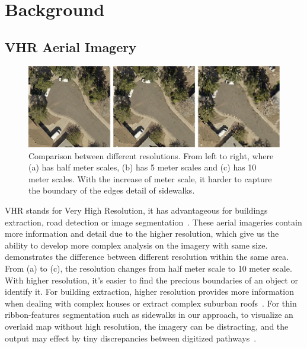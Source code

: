 \chapter{Background}


\section{\ac{VHR} Aerial Imagery}

\begin{figure}[H]
    \centering
    \includegraphics[width=\textwidth]{Figures/arz_7_res_compare.png}
    \caption[Resolution Comparison]{Comparison between different resolutions. From left to right, where (a) has half meter scales, (b) has 5 meter scales and (c) has 10 meter scales. With the increase of meter scale, it harder to capture the boundary of the edges detail of sidewalks.}
    \label{fig:vhr_compare}
\end{figure}

\ac{VHR} stands for Very High Resolution, it has advantageous for buildings extraction, road detection or image segmentation~\cite{FREIRE20141, 10.1007/BFb0015525, 10.1007/978-3-642-15567-3_16}. 
These aerial imageries contain more information and detail due to the higher resolution, which give us the ability to develop more complex analysis on the imagery with same size.
 demonstrates the difference between different resolution within the same area. From (a) to (c), the resolution changes from half meter scale to 10 meter scale. 
With higher resolution, it's easier to find the precious boundaries of an object or identify it. 
For building extraction, higher resolution provides more information when dealing with complex houses or extract complex suburban roofs~\cite{10.1007/BFb0015525}. 
For thin ribbon-features segmentation such as sidewalks in our approach, to visualize an overlaid map without high resolution, the imagery can be distracting, and the output may effect by tiny discrepancies between digitized pathways~\cite{10.1007/978-3-642-15567-3_16}. 

